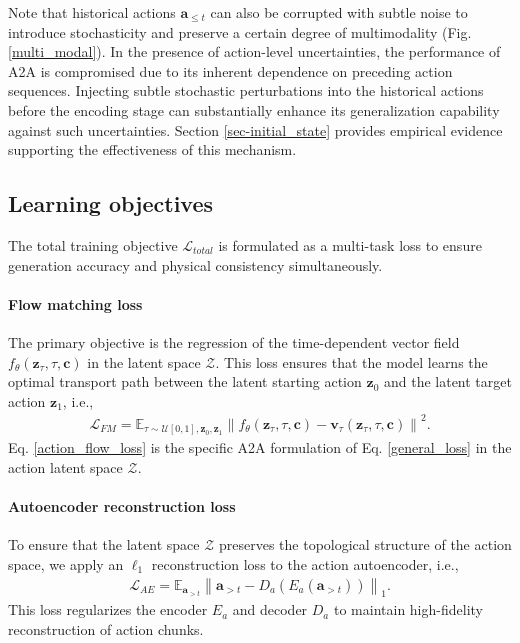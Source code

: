 \documentclass[onecolumn]{fairmeta}
\newcommand{\m}[1]{{A2A}}
\begin{document}
	Note that historical actions $\mathbf{a}_{\leq t}$ can also be corrupted with subtle noise to introduce stochasticity and preserve a certain degree of multimodality (Fig. \ref{multi_modal}). In the presence of action-level uncertainties, the performance of \m{} is compromised due to its inherent dependence on preceding action sequences. Injecting subtle stochastic perturbations into the historical actions before the encoding stage can substantially enhance its generalization capability against such uncertainties. Section \ref{sec-initial_state} provides empirical evidence supporting the effectiveness of this mechanism.
	
	
	\subsection{Learning objectives}
	
	The total training objective $\mathcal{L}_{total}$ is formulated as a multi-task loss to ensure generation accuracy and physical consistency simultaneously.
	
	\paragraph{Flow matching loss} The primary objective is the regression of the time-dependent vector field $f_\theta(\mathbf{z}_\tau, \tau, \mathbf{c})$ in the latent space $\mathcal{Z}$. This loss ensures that the model learns the optimal transport path between the latent starting action $\mathbf{z}_0$ and the latent target action $\mathbf{z}_1$, i.e.,
	\begin{equation}
		\begin{aligned}
			\mathcal{L}_{FM} = \mathbb{E}_{\tau \sim \mathcal{U}[0,1], \mathbf{z}_0, \mathbf{z}_1} \left\| f_\theta(\mathbf{z}_\tau, \tau, \mathbf{c}) - \mathbf{v}_\tau(\mathbf{z}_\tau, \tau, \mathbf{c}) \right\|^2.
			\label{action_flow_loss}
		\end{aligned}
	\end{equation}
	Eq. \eqref{action_flow_loss} is the specific \m{} formulation of Eq. \eqref{general_loss} in the action latent space $\mathcal{Z}$.
	
	\paragraph{Autoencoder reconstruction loss} To ensure that the latent space $\mathcal{Z}$ preserves the topological structure of the action space, we apply an $\ell_1$ reconstruction loss to the action autoencoder, i.e.,
	\begin{equation}
		\begin{aligned}
			\mathcal{L}_{AE} = \mathbb{E}_{\mathbf{a}_{> t}} \left\| \mathbf{a}_{> t} - D_a(E_a(\mathbf{a}_{> t})) \right\|_1.
		\end{aligned}
	\end{equation}
	This loss regularizes the encoder $E_a$ and decoder $D_a$ to maintain high-fidelity reconstruction of action chunks.
	
\end{document}
